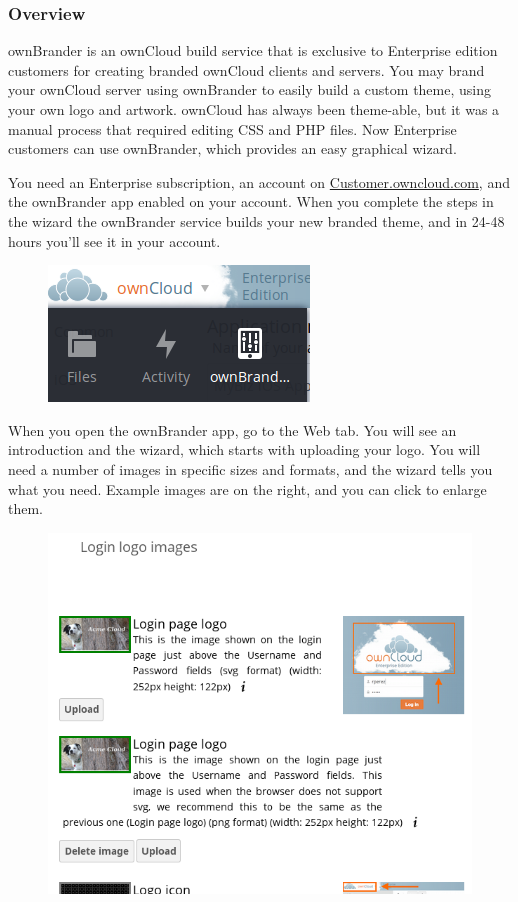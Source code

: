 \documentclass[letterpaper,10pt,english]{sphinxmanual}
\begin{document}
\subsubsection{Overview}
\label{enterprise_server_branding/enterprise_server_branding:overview}
ownBrander is an ownCloud build service that is exclusive to Enterprise
edition customers for creating branded ownCloud clients and servers. You
may brand your ownCloud server using ownBrander to easily build a custom theme,
using your own logo and artwork. ownCloud has always been theme-able, but it was
a manual process that required editing CSS and PHP files. Now Enterprise
customers can use ownBrander, which provides an easy graphical wizard.

You need an Enterprise subscription, an account on
\href{https://customer.owncloud.com/owncloud}{Customer.owncloud.com}, and the
ownBrander app enabled on your account. When you
complete the steps in the wizard the ownBrander service builds your new branded
theme, and in 24-48 hours you'll see it in your account.
\begin{figure}[htbp]
\centering

\includegraphics{ownbrander-11.png}
\end{figure}

When you open the ownBrander app, go to the Web tab. You will see an
introduction and the wizard, which starts with uploading your logo. You will
need a number of images in specific sizes and formats, and the wizard tells you
what you need. Example images are on the right, and you can click to enlarge
them.
\begin{figure}[htbp]
\centering

\includegraphics{webbrander-1.png}
\end{figure}
\end{document}
